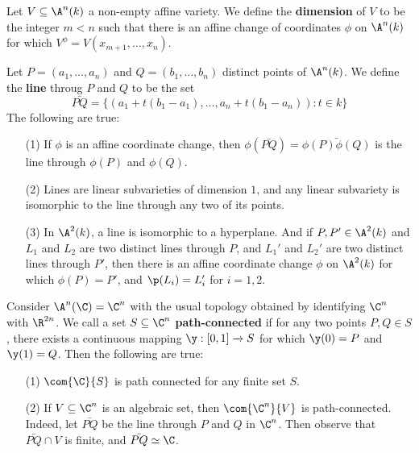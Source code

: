 \begin{definition}
  Let $V \subseteq \A^n(k)$ a non-empty affine variety. We define the
  \textbf{dimension} of $V$ to be the integer $m<n$ such that there is an affine
  change of coordinates $\phi$ on $\A^n(k)$ for which $V^\phi=V(x_{m+1}, \dots,
  x_n)$.
\end{definition}

\begin{example}\label{example_2.4}
  Let $P=(a_1, \dots, a_n)$ and $Q=(b_1, \dots, b_n)$ distinct points of
  $\A^n(k)$. We define the \textbf{line} throug $P$ and $Q$ to be the set
  \begin{equation*}
    \bar{PQ}=\{(a_1+t(b_1-a_1), \dots, a_n+t(b_1-a_n)) : t \in k\}
  \end{equation*}
  The following are true:
  \begin{enumerate}
    \item[(1)] If $\phi$ is an affine coordinate change, then
      $\phi(\bar{PQ})=\bar{\phi(P)\phi(Q)}$ is the line through $\phi(P)$ and
      $\phi(Q)$.

    \item[(2)] Lines are linear subvarieties of dimension $1$, and any linear
      subvariety is isomorphic to the line through any two of its points.

    \item[(3)] In $\A^2(k)$, a line is isomorphic to a hyperplane. And if $P,P'
      \in \A^2(k)$ and $L_1$ and $L_2$ are two distinct lines through $P$, and
      $L_1'$ and $L_2'$ are two distinct lines through $P'$, then there is an
      affine coordinate change  $\phi$ on  $\A^2(k)$ for which $\phi(P)=P'$, and
      $\p(L_i)=L_i'$ for $i=1,2$.
  \end{enumerate}
\end{example}

\begin{example}\label{example_2.5}
  Consider $\A^n(\C)=\C^n$ with the usual topology obtained by identifying
  $\C^n$ with  $\R^{2n}$. We call a set $S \subseteq \C^n$
  \textbf{path-connected} if for any two points $P,Q \in S$, there exists a
  continuous mapping $\y:[0,1] \xrightarrow{} S$ for which $\y(0)=P$ and
  $\y(1)=Q$. Then the following are true:
  \begin{enumerate}
    \item[(1)] $\com{\C}{S}$ is path connected for any finite set $S$.

    \item[(2)] If $V \subseteq \C^n$ is an algebraic set, then $\com{\C^n}{V}$
      is path-connected. Indeed, let $\bar{PQ}$ be the line through $P$ and  $Q$
      in $\C^n$. Then observe that $\bar{PQ} \cap V$ is finite, and $\bar{PQ}
      \simeq \C$.
  \end{enumerate}
\end{example}

